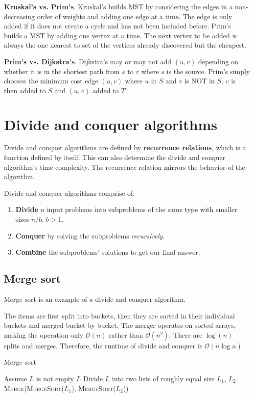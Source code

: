 \documentclass{article}
\newcommand{\Oh}{\mathcal{O}}
\begin{document}
\textbf{Kruskal's vs. Prim's}. Kruskal's builds MST by considering the edges in a non-decreasing order of weights and adding one edge at a time. The edge is only added if it does not create a cycle and has not been included before. Prim's builds a MST by adding one vertex at a time. The next vertex to be added is always the one nearest to set of the vertices already discovered but the cheapest.

\textbf{Prim's vs. Dijkstra's}. Dijkstra's may or may not add $(u, v)$ depending on whether it is in the shortest path from $s$ to $v$ where $s$ is the source. Prim's simply chooses the minimum cost edge $(u, v)$ where $u$ in $S$ and $v$ is NOT in $S$. $v$ is then added to $S$ and $(u, v)$ added to $T$.

\section{Divide and conquer algorithms}
Divide and conquer algorithms are defined by \textbf{recurrence relations}, which is a function defined by itself. This can also determine the divide and conquer algorithm's time complexity. The recurrence relation mirrors the behavior of the algorithm.

Divide and conquer algorithms comprise of:
\begin{enumerate}
    \item \textbf{Divide} $n$ input problems into subproblems of the same type with smaller sizes $n/b$, $b > 1$.
    \item \textbf{Conquer} by solving the subproblems \textit{recursively}.
    \item \textbf{Combine} the subproblems' solutions to get our final answer.
\end{enumerate}

\subsection{Merge sort}
Merge sort is an example of a divide and conquer algorithm.

The items are first split into buckets, then they are sorted in their individual buckets and merged bucket by bucket. The merger operates on sorted arrays, making the operation only $\Oh(n)$ rather than $\Oh(n^2)$. There are $\log(n)$ splits and merges. Therefore, the runtime of divide and conquer is $\Oh(n \log n)$.

\begin{algorithm}
\caption{Merge sort}\label{mergeSort}
\begin{algorithmic}[1]
\State Assume $L$ is not empty
    \State \Return $L$
\Else
    \State Divide $L$ into two lists of roughly equal size $L_1$, $L_2$
    \State \Return \textsc{Merge}(\textsc{MergeSort}($L_1$), \textsc{MergeSort}($L_2$))
\EndIf
\EndProcedure
\end{algorithmic}
\end{algorithm}
\end{document}
